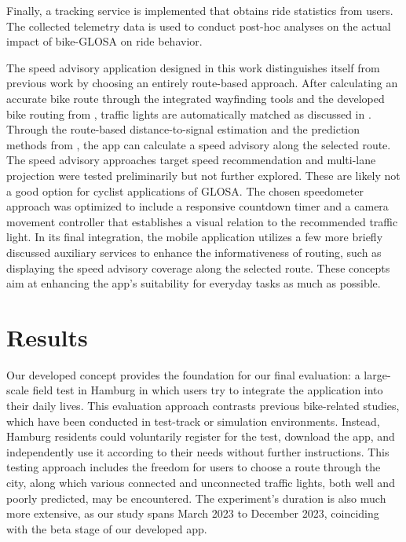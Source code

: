 Finally, a tracking service is implemented that obtains ride statistics from users. The collected telemetry data is used to conduct post-hoc analyses on the actual impact of bike-GLOSA on ride behavior.

\begin{Summary}
The speed advisory application designed in this work distinguishes itself from previous work by choosing an entirely route-based approach. After calculating an accurate bike route through the integrated wayfinding tools and the developed bike routing from , traffic lights are automatically matched as discussed in . Through the route-based distance-to-signal estimation and the prediction methods from , the app can calculate a speed advisory along the selected route. The speed advisory approaches target speed recommendation and multi-lane projection were tested preliminarily but not further explored. These are likely not a good option for cyclist applications of GLOSA. The chosen speedometer approach was optimized to include a responsive countdown timer and a camera movement controller that establishes a visual relation to the recommended traffic light. In its final integration, the mobile application utilizes a few more briefly discussed auxiliary services to enhance the informativeness of routing, such as displaying the speed advisory coverage along the selected route. These concepts aim at enhancing the app's suitability for everyday tasks as much as possible. 
\end{Summary}

\section{Results}

Our developed concept provides the foundation for our final evaluation: a large-scale field test in Hamburg in which users try to integrate the application into their daily lives. This evaluation approach contrasts previous bike-related studies, which have been conducted in test-track or simulation environments. Instead, Hamburg residents could voluntarily register for the test, download the app, and independently use it according to their needs without further instructions. This testing approach includes the freedom for users to choose a route through the city, along which various connected and unconnected traffic lights, both well and poorly predicted, may be encountered. The experiment's duration is also much more extensive, as our study spans March 2023 to December 2023, coinciding with the beta stage of our developed app.

